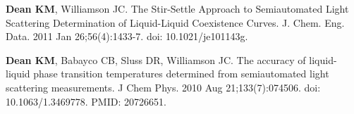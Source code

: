 \begin{etaremune}
\item \textbf{Dean KM}, Williamson JC. The Stir-Settle Approach to Semiautomated Light Scattering Determination of Liquid-Liquid Coexistence Curves.  J. Chem. Eng. Data.  2011 Jan 26;56(4):1433-7. doi: 10.1021/je101143g.

\item \textbf{Dean KM}, Babayco CB, Sluss DR, Williamson JC. The accuracy of liquid-liquid phase transition temperatures determined from semiautomated light scattering measurements. J Chem Phys. 2010 Aug 21;133(7):074506. doi: 10.1063/1.3469778. PMID: 20726651.

\end{etaremune}
